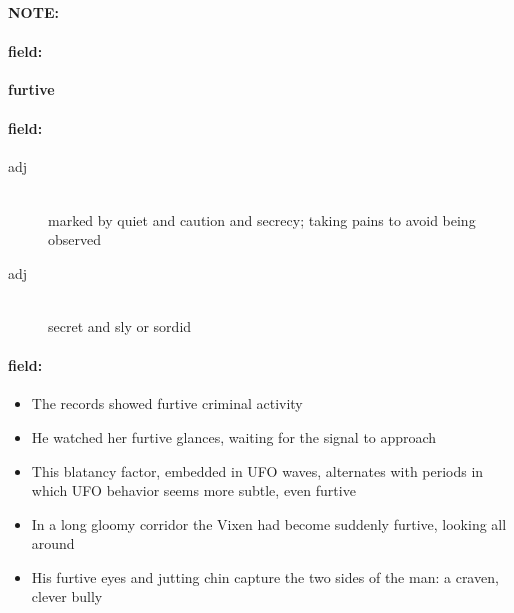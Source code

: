 \documentclass[12pt]{article}
\newenvironment{note}{\paragraph{NOTE:}}{}
\newenvironment{field}{\paragraph{field:}}{}
\begin{document}
\begin{note}
\begin{field}
\textbf{\large furtive}
\end{field}


\begin{field}
\begin{description}
\item[adj] \hfill \\ 
marked by quiet and caution and secrecy; taking pains to avoid being observed

\item[adj] \hfill \\ 
secret and sly or sordid

\end{description}
\end{field}

\begin{field}
\begin{itemize}
\item The records showed furtive criminal activity
\item He watched her furtive glances, waiting for the signal to approach
\item This blatancy factor, embedded in UFO waves, alternates with periods in which UFO behavior seems more subtle, even furtive
\item In a long gloomy corridor the Vixen had become suddenly furtive, looking all around
\item His furtive eyes and jutting chin capture the two sides of the man: a craven, clever bully
\end{itemize}
\end{field}
\end{note}
\end{document}
